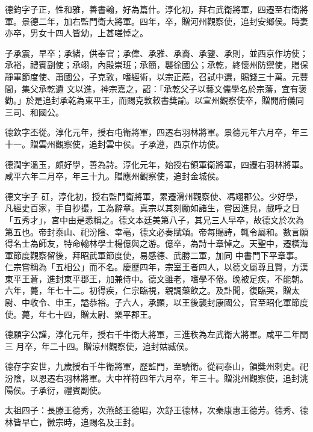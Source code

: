 \begin{pinyinscope}
 德鈞字子正，性和雅，善書翰，好為篇什。淳化初，拜右武衛將軍，四遷至右衛將軍。景德二年，加右監門衛大將軍。四年，卒，贈河州觀察使，追封安鄉侯。時妻亦卒，男女十四人皆幼，上甚嗟悼之。



 子承震，早卒；承緒，供奉官；承偉、承雅、承裔、承鑒、承則，並西京作坊使；承裕，禮賓副使；承翊，內殿崇班；承簡，襲徐國公；承乾，終懷州防禦使，贈保靜軍節度使、蕭國公，子克敦，嗜經術，以宗正薦，召試中選，賜錢三十萬。元豐間，集父承乾遺
 文以進，神宗嘉之，詔：「承乾父子以藝文儒學名於宗藩，宜有褒勸。」於是追封承乾為東平王，而賜克敦敕書獎諭。以宣州觀察使卒，贈開府儀同三司、和國公。



 德欽字丕從。淳化元年，授右屯衛將軍，四遷右羽林將軍。景德元年六月卒，年三十一。贈雲州觀察使，追封雲中侯。子承遵，西京作坊使。



 德潤字溫玉，頗好學，善為詩。淳化元年，始授右領軍衛將軍，四遷右羽林將軍。咸平六年二月卒，年三十九。贈應州觀察使，追封金城侯。



 德文字子
 矼，淳化初，授右監門衛將軍，累遷滑州觀察使、馮翊郡公。少好學，凡經史百家，手自抄撮，工為辭章。真宗以其刻勵如諸生，嘗因進見，戲呼之日「五秀才」，宮中由是悉稱之。德文本廷美第八子，其兄三人早卒，故德文於次為第五也。帝封泰山、祀汾陰、幸亳，德文必奏賦頌。帝每賜詩，輒令屬和。數言願得名士為師友，特命翰林學士楊億與之游。億卒，為詩十章悼之。天聖中，遷橫海軍節度觀察留後，拜昭武軍節度使，易感德、武勝二軍，加同
 中書門下平章事。仁宗嘗稱為「五相公」而不名。慶歷四年，宗室王者四人，以德文屬尊且賢，方漢東平王蒼，進封東平郡王，加兼侍中。德文雖老，嗜學不倦。晚被足疾，不能朝。六年，薨，年七十二。初得疾，仁宗臨視，親調藥飲之。及訃聞，復臨哭，贈太尉、中收令、申王，謚恭裕。子六人，承顯，以王後襲封康國公，官至昭化軍節度使。薨，年七十四，贈太尉、樂平郡王。



 德願字公謹，淳化元年，授右千牛衛大將軍，三進秩為左武衛大將軍。咸平二年閏三
 月卒，年二十四。贈涼州觀察使，追封姑臧侯。



 德存字安世，九歲授右千牛衛將軍，歷監門，至驍衛。從祠泰山，領獎州刺史。祀汾陰，以恩遷右羽林將軍。大中祥符四年六月卒，年三十。贈洮州觀察使，追封洮陽侯。子承衍，禮賓副使。



 太祖四子：長滕王德秀，次燕懿王德昭，次舒王德林，次秦康惠王德芳。德秀、德林皆早亡，徽宗時，追賜名及王封。




\end{pinyinscope}
